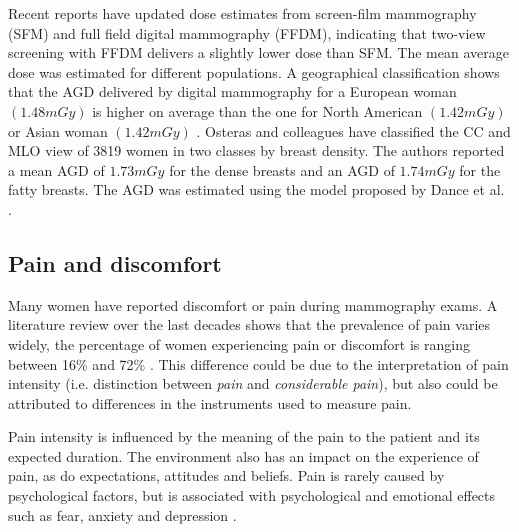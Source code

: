 Recent reports have updated dose estimates from screen-film mammography (SFM) and full field digital mammography (FFDM), indicating that two-view screening with FFDM delivers a slightly lower dose than SFM. The mean average dose was estimated for different populations. A geographical classification shows that the AGD delivered by digital mammography for a European woman  $(1.48 mGy)$ is higher on average than the one for North American $(1.42 mGy)$ or Asian woman $(1.42 mGy)$ \citep{geeraert_breast_2012}. Osteras and colleagues \cite{osteraas_average_2018} have classified the CC and MLO view of 3819 women in two classes by breast density. The authors reported a mean AGD of $1.73 mGy$ for the dense breasts and an AGD of $1.74 mGy$ for the fatty breasts. The AGD was estimated using the model proposed by Dance et al. \cite{dance_additional_2000}.  


\subsection{Pain and discomfort}
Many women have reported discomfort or pain during mammography exams. A literature review over the last decades shows that the  prevalence of pain varies widely, the percentage of women experiencing pain or discomfort is ranging between 16\% and 72\% \citep{keemers_pain_2000, peipins_impact_2006,dullum_rates_2000, whelehan_effect_2013}. This difference could be due to the interpretation of pain intensity (i.e. distinction between \textit{pain} and \textit{considerable pain}),  but also could be attributed to differences in the instruments used to measure pain. 

Pain intensity is influenced by the meaning of the pain to the patient and its expected duration. The environment also has an impact on the experience of pain, as do expectations, attitudes and beliefs. Pain is rarely caused by psychological factors, but is associated with psychological and emotional effects such as fear, anxiety and
depression \citep{williamson_pain_2005}.

